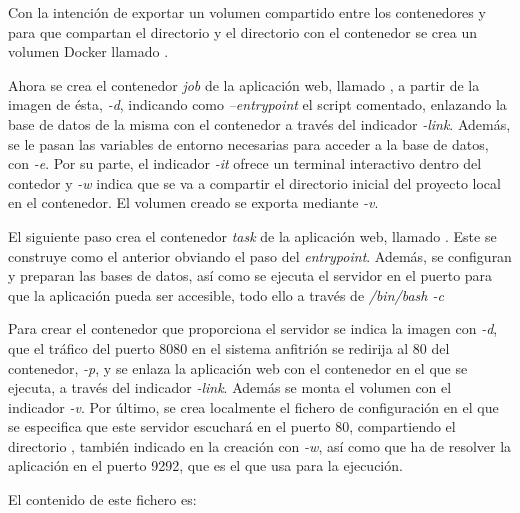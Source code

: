 Con la intención de exportar un volumen compartido entre los contenedores  y  para que compartan el directorio  y el directorio  con el contenedor  se crea un volumen Docker llamado .

Ahora se crea el contenedor \textit{job} de la aplicación web, llamado , a partir de la imagen de ésta, \textit{\--d}, indicando como \textit{\---entrypoint} el script comentado, enlazando la base de datos de la misma con el contenedor  a través del indicador \textit{\--link}. Además, se le pasan las variables de entorno necesarias para acceder a la base de datos, con \textit{\--e}. Por su parte, el indicador \textit{\--it} ofrece un terminal interactivo dentro del contedor y \textit{\--w} indica que se va a compartir el directorio inicial del proyecto local en el contenedor. El volumen creado se exporta mediante \textit{\--v}.

El siguiente paso crea el contenedor \textit{task} de la aplicación web, llamado . Este se construye como el anterior obviando el paso del \textit{entrypoint}. Además, se configuran y preparan las bases de datos, así como se ejecuta el servidor  en el puerto  para que la aplicación pueda ser accesible, todo ello a través de \textit{/bin/bash \--c}

Para crear el contenedor  que proporciona el servidor  se indica la imagen con \textit{\--d}, que el tráfico del puerto 8080 en el sistema anfitrión se redirija al 80 del contenedor, \textit{\--p}, y se enlaza la aplicación web con el contenedor en el que se ejecuta, a través del indicador \textit{\--link}. Además se monta el volumen  con el indicador \textit{\--v}. Por último, se crea localmente el fichero de configuración  en el que se especifica que este servidor escuchará en el puerto 80, compartiendo el directorio , también indicado en la creación con \textit{\--w}, así como que ha de resolver la aplicación en el puerto 9292, que es el que usa  para la ejecución.  

El contenido de este fichero es: 
\begin{codelisting}
\label{code:nginxconf}
\end{codelisting}

